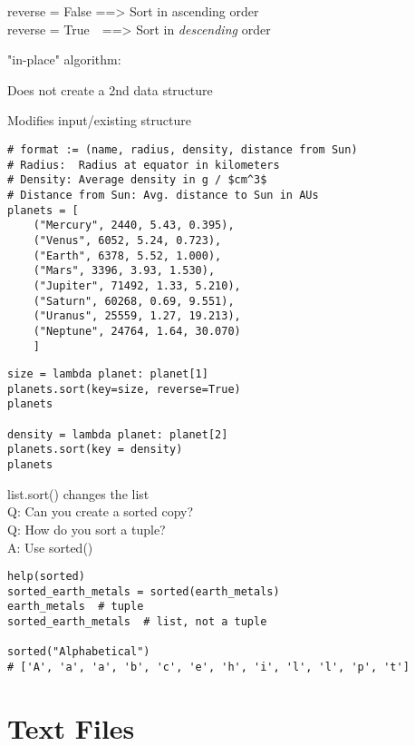 \documentclass{beamer}
\begin{document}
\begin{frame}[fragile]{}
\small{reverse = False   ==> Sort in ascending order\\
reverse = True\ \ ==> Sort in \textit{descending} order\par
\vspace{5pt}
"in-place" algorithm: \par
\hspace{3cm}Does not create a 2nd data structure\par
\hspace{3cm}Modifies input/existing structure}
\begin{verbatim}
# format := (name, radius, density, distance from Sun)
# Radius:  Radius at equator in kilometers
# Density: Average density in g / $cm^3$
# Distance from Sun: Avg. distance to Sun in AUs
planets = [
    ("Mercury", 2440, 5.43, 0.395),
    ("Venus", 6052, 5.24, 0.723),
    ("Earth", 6378, 5.52, 1.000),
    ("Mars", 3396, 3.93, 1.530),
    ("Jupiter", 71492, 1.33, 5.210),
    ("Saturn", 60268, 0.69, 9.551),
    ("Uranus", 25559, 1.27, 19.213),
    ("Neptune", 24764, 1.64, 30.070)
    ]
\end{verbatim}
\end{frame}

\begin{frame}[fragile]{}
\begin{verbatim}
size = lambda planet: planet[1]
planets.sort(key=size, reverse=True)
planets

density = lambda planet: planet[2]
planets.sort(key = density)
planets
\end{verbatim}
\small{list.sort() changes the list\\
Q: Can you create a sorted copy?\\
Q: How do you sort a tuple?\\
A: Use sorted()}
\begin{verbatim}
help(sorted)
sorted_earth_metals = sorted(earth_metals)
earth_metals  # tuple
sorted_earth_metals  # list, not a tuple

sorted("Alphabetical")
# ['A', 'a', 'a', 'b', 'c', 'e', 'h', 'i', 'l', 'l', 'p', 't']
\end{verbatim}
\end{frame}

\section{Text Files}
\end{document}
